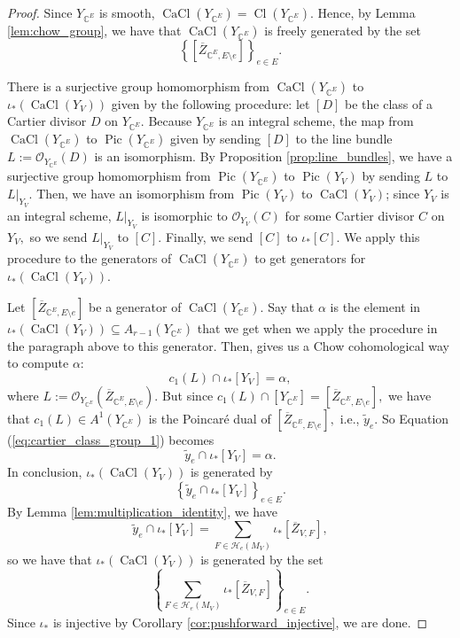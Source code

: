 \documentclass{amsart}
\theoremstyle{plain}
\theoremstyle{definition}
\newcommand{\Cl}{\operatorname{Cl}}
\newcommand{\CaCl}{\operatorname{CaCl}}
\newcommand{\Pic}{\operatorname{Pic}}
\begin{document}
\begin{proof}
    Since $Y_{\mathbb{C}^E}$ is smooth, $\CaCl(Y_{\mathbb{C}^E}) = \Cl(Y_{\mathbb{C}^E}).$  Hence, by Lemma \ref{lem:chow_group}, we have that $\CaCl(Y_{\mathbb{C}^E})$ is freely generated by the set
    \[ \left\{ [\overline{Z}_{\mathbb{C}^E,E\setminus e} ] \right\}_{e\in E}.\]

    There is a surjective group homomorphism from $\CaCl(Y_{\mathbb{C}^E})$ to $\iota_*(\CaCl(Y_V))$ given by the following procedure: let $[D]$ be the class of a Cartier divisor $D$ on $Y_{\mathbb{C}^E}.$ Because $Y_{\mathbb{C}^E}$ is an integral scheme, the map from $\CaCl(Y_{\mathbb{C}^E})$ to $\Pic(Y_{\mathbb{C}^E})$ given by sending $[D]$ to the line bundle $L := \mathcal{O}_{Y_{\mathbb{C}^E}}(D)$ is an isomorphism. By Proposition \ref{prop:line_bundles}, we have a surjective group homomorphism from $\Pic(Y_{\mathbb{C}^E})$ to $\Pic(Y_V)$ by sending $L$ to $L|_{Y_V}.$ Then, we have an isomorphism from $\Pic(Y_V)$ to $\CaCl(Y_V)$; since $Y_V$ is an integral scheme, $L|_{Y_V}$ is isomorphic to $\mathcal{O}_{Y_V}(C)$ for some Cartier divisor $C$ on $Y_V,$ so we send $L|_{Y_V}$ to $[C].$ Finally, we send $[C]$ to $\iota_*[C].$ We apply this procedure to the generators of $\CaCl(Y_{\mathbb{C}^E})$ to get generators for $\iota_*(\CaCl(Y_V)).$
    
    Let $[\overline{Z}_{\mathbb{C}^E,E\setminus e}]$ be a generator of $\CaCl(Y_{\mathbb{C}^E})$. Say that $\alpha$ is the element in $\iota_*(\CaCl(Y_V)) \subseteq A_{r-1}(Y_{\mathbb{C}^E})$ that we get when we apply the procedure in the paragraph above to this generator. Then, \cite[Chapter 2]{intersection_theory} gives us a Chow cohomological way to compute $\alpha $:
    \begin{equation}
    \label{eq:cartier_class_group_1}
    c_1(L) \cap \iota_*[Y_V] = \alpha,
    \end{equation}
    where $L :=\mathcal{O}_{Y_{\mathbb{C}^E}}(\overline{Z}_{\mathbb{C}^E,E\setminus e}).$
    But since
    $c_1(L) \cap [Y_{\mathbb{C}^E}] = [\overline{Z}_{\mathbb{C}^E,E\setminus e}],$ we have that $c_1(L) \in A^1(Y_{\mathbb{C}^E})$ is the Poincar\'e dual of $[\overline{Z}_{\mathbb{C}^E,E\setminus e}],$ i.e., $\tilde{y}_e.$ So Equation (\ref{eq:cartier_class_group_1}) becomes
    \[\tilde{y}_e \cap \iota_*[Y_V] = \alpha.\]
    In conclusion, $\iota_*(\CaCl(Y_V))$ is generated by
    \[ \left\{ \tilde{y}_e \cap \iota_*[Y_V]\right\}_{e\in E}.\]    
    By Lemma \ref{lem:multiplication_identity}, we have
    \[\tilde{y}_e \cap \iota_*[Y_V] = \sum_{F \in \mathcal{H}_e(M_V)} \iota_*[\overline{Z}_{V,F} ], \] 
    so we have that $\iota_*(\CaCl(Y_V))$ is generated by the set
    \[ \left\{ \sum_{F \in \mathcal{H}_e(M_V)} \iota_*[\overline{Z}_{V,F} ] \right\}_{e\in E}.\]
    Since $\iota_*$ is injective by Corollary \ref{cor:pushforward_injective},
    we are done.    
\end{proof}
\end{document}
